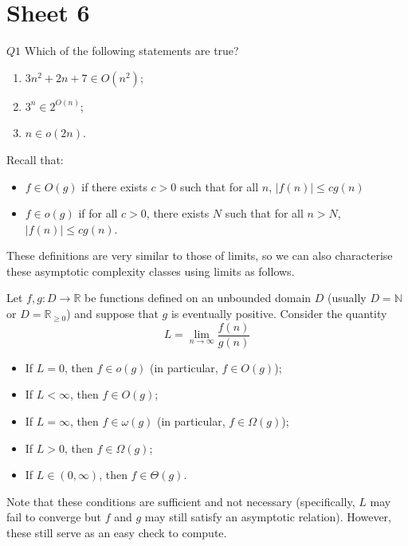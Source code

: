 \documentclass{article}
\theoremstyle{definition}
\theoremstyle{definition}
\theoremstyle{remark}
\begin{document}
\newpage

\section{Sheet 6}


\begin{questionbox}{$Q1$}
    Which of the following statements are true?
    \begin{enumerate}
        \item[$(i)$] $3n^2+2n+7\in O(n^2)$;
        
        \item[$(ii)$] $3^n\in2^{O(n)}$;
    
        \item[$(iii)$] $n\in o(2n)$.
    \end{enumerate}
\end{questionbox}

\bigskip

Recall that:
\begin{itemize}
    \item $f\in O(g)$ if there exists $c>0$ such that for all $n$, $|f(n)|\leq cg(n)$
    
    \item $f\in o(g)$ if for all $c>0$, there exists $N$ such that for all $n>N$, $|f(n)|\leq cg(n)$.
\end{itemize}

These definitions are very similar to those of limits, so we can also characterise these asymptotic complexity classes using limits as follows.

Let $f,g:D\rightarrow\mathbb{R}$ be functions defined on an unbounded domain $D$ (usually $D=\mathbb{N}$ or $D=\mathbb{R}_{\geq0}$) and suppose that $g$ is eventually positive. Consider the quantity
\begin{equation*}
    L=\lim_{n\rightarrow\infty}\frac{f(n)}{g(n)}
\end{equation*}

\begin{itemize}
    \item If $L=0$, then $f\in o(g)$ (in particular, $f\in O(g)$);
    \item If $L<\infty$, then $f\in O(g)$;
    \item If $L=\infty$, then $f\in\omega(g)$ (in particular, $f\in\Omega(g)$);
    \item If $L>0$, then $f\in\Omega(g)$;
    \item If $L\in(0,\infty)$, then $f\in\Theta(g)$.
\end{itemize}
Note that these conditions are sufficient and not necessary (specifically, $L$ may fail to converge but $f$ and $g$ may still satisfy an asymptotic relation). However, these still serve as an easy check to compute.
\end{document}
